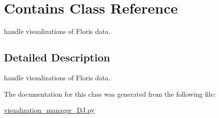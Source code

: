 \hypertarget{class_contains}{}\section{Contains Class Reference}
\label{class_contains}


handle visualizations of Floris data.  




\subsection{Detailed Description}
handle visualizations of Floris data. 



The documentation for this class was generated from the following file\+:\begin{DoxyCompactItemize}
\item 
\mbox{\hyperlink{visualization__manager___d_j_8py}{visualization\+\_\+manager\+\_\+\+D\+J.\+py}}\end{DoxyCompactItemize}
